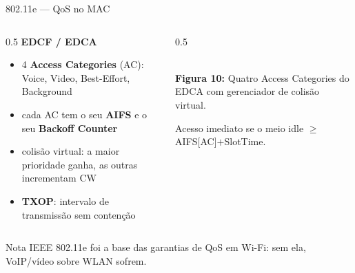 \documentclass[aspectratio=169,11pt]{beamer}
\begin{document}
\begin{frame}{802.11e --- QoS no MAC}
  \begin{columns}
    \begin{column}{0.5\textwidth}
      \textbf{EDCF / EDCA}
      \begin{itemize}
        \item 4 \textbf{Access Categories} (AC): Voice, Video, Best-Effort, Background
        \item cada AC tem o seu \textbf{AIFS} e o seu \textbf{Backoff Counter}
        \item colisão virtual: a maior prioridade ganha, as outras incrementam CW
        \item \textbf{TXOP}: intervalo de transmissão sem contenção
      \end{itemize}
    \end{column}
    \begin{column}{0.5\textwidth}
      \begin{center}
        \\[1mm]
        {\scriptsize \textbf{Figura 10:} Quatro Access Categories do EDCA com gerenciador de colisão virtual.}
      \end{center}
      {\scriptsize Acesso imediato se o meio idle $\geq$ AIFS[AC]$+$SlotTime.}
    \end{column}
  \end{columns}
  \pause
  \begin{exampleblock}{Nota}
    IEEE 802.11e foi a base das garantias de QoS em Wi-Fi: sem ela, VoIP/vídeo sobre WLAN sofrem.
  \end{exampleblock}
\end{frame}
\end{document}
